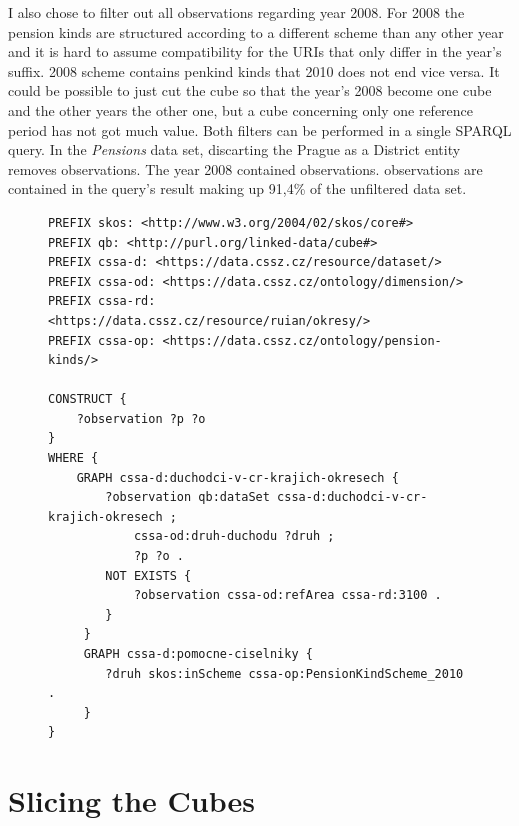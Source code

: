 I also chose to filter out all observations regarding year 2008. For 2008 the pension kinds are structured according to a different scheme than any other year and it is hard to assume compatibility for the URIs that only differ in the year's suffix. 2008 scheme contains penkind kinds that 2010 does not end vice versa. It could be possible to just cut the cube so that the year's 2008 become one cube and the other years the other one, but a cube concerning only one reference period has not got much value. Both filters can be performed in a single SPARQL query. In the \textit{Pensions} data set, discarting the Prague as a District entity removes  observations. The year 2008 contained  observations.  observations are contained in the query's result making up 91,4\% of the unfiltered data set.

\begin{figure}[h]
\begin{lstlisting}[language = SPARQL, caption={SPARQL query to filter the \textit{Pensions} data set (Source: author)}, label={sparqlexample},captionpos=b escapeinside={(*@}{@*)}]
PREFIX skos: <http://www.w3.org/2004/02/skos/core#>
PREFIX qb: <http://purl.org/linked-data/cube#>
PREFIX cssa-d: <https://data.cssz.cz/resource/dataset/>
PREFIX cssa-od: <https://data.cssz.cz/ontology/dimension/>
PREFIX cssa-rd: <https://data.cssz.cz/resource/ruian/okresy/>
PREFIX cssa-op: <https://data.cssz.cz/ontology/pension-kinds/>

CONSTRUCT {
    ?observation ?p ?o
} 
WHERE {
    GRAPH cssa-d:duchodci-v-cr-krajich-okresech {
        ?observation qb:dataSet cssa-d:duchodci-v-cr-krajich-okresech ;
            cssa-od:druh-duchodu ?druh ;
            ?p ?o .
        NOT EXISTS {
            ?observation cssa-od:refArea cssa-rd:3100 .
        }
     }
     GRAPH cssa-d:pomocne-ciselniky {
        ?druh skos:inScheme cssa-op:PensionKindScheme_2010 .
     }
}
\end{lstlisting}
\end{figure}

\section{Slicing the Cubes\label{cssaSlicing}}

